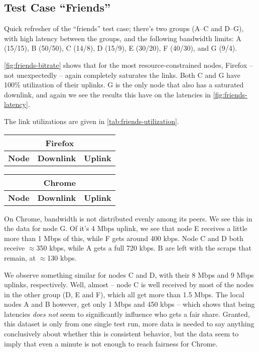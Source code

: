 \subsection{Test Case ``Friends''}

Quick refresher of the ``friends'' test case; there's two groups (A--C and D--G), with high latency between the groups, and the following bandwidth limits: A (15/15), B (50/50), C (14/8), D (15/9), E (30/20), F (40/30), and G (9/4).

\autoref{fig:friends-bitrate} shows that for the most resource-constrained nodes, Firefox -- not unexpectedly -- again completely saturates the links. Both C and G have 100\% utilization of their uplinks. G is the only node that also has a saturated downlink, and again we see the results this have on the latencies in \autoref{fig:friends-latency}.

The link utilizations are given in \autoref{tab:friends-utilization}.

\begin{center}
    \label{tab:friends-utilization}
    \begin{tabular}{| l | l | l |}
    \multicolumn{3}{c}{\textbf{Firefox}} \\ \hline
    \textbf{Node} & \textbf{Downlink} & \textbf{Uplink} \\ \hline
    
    \hline
    \end{tabular}
    \begin{tabular}{| l | l | l |}
    \multicolumn{3}{c}{\textbf{Chrome}} \\ \hline
    \textbf{Node} & \textbf{Downlink} & \textbf{Uplink} \\ \hline
    
    \hline
    \end{tabular}
\end{center}

On Chrome, bandwidth is not distributed evenly among its peers. We see this in the data for node G. Of it's 4 Mbps uplink, we see that node E receives a little more than 1 Mbps of this, while F gets around 400 kbps. Node C and D both receive $\approx$350 kbps, while A gets a full 720 kbps. B are left with the scraps that remain, at $\approx$130 kbps.

We observe something similar for nodes C and D, with their 8 Mbps and 9 Mbps uplinks, respectively. Well, almost -- node C is well received by most of the nodes in the other group (D, E and F), which all get more than 1.5 Mbps. The local nodes A and B however, get only 1 Mbps and 450 kbps -- which shows that being latencies \emph{does not} seem to significantly influence who gets a fair share. Granted, this dataset is only from one single test run, more data is needed to say anything conclusively about whether this is consistent behavior, but the data seem to imply that even a minute is not enough to reach fairness for Chrome.

